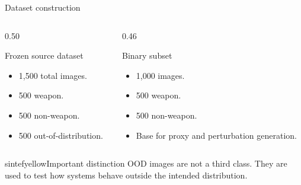 \documentclass{beamer}
\begin{document}
\begin{frame}{Dataset construction}

\begin{columns}

\begin{column}{0.50\textwidth}
\begin{block}{Frozen source dataset}
\begin{itemize}
    \item 1,500 total images.
    \item 500 weapon.
    \item 500 non-weapon.
    \item 500 out-of-distribution.
\end{itemize}
\end{block}
\end{column}

\begin{column}{0.46\textwidth}
\begin{block}{Binary subset}
\begin{itemize}
    \item 1,000 images.
    \item 500 weapon.
    \item 500 non-weapon.
    \item Base for proxy and perturbation generation.
\end{itemize}
\end{block}
\end{column}

\end{columns}

\begin{colorblock}[black]{sintefyellow}{Important distinction}
OOD images are not a third class. They are used to test how systems behave outside the intended distribution.
\end{colorblock}

\end{frame}

\end{document}
